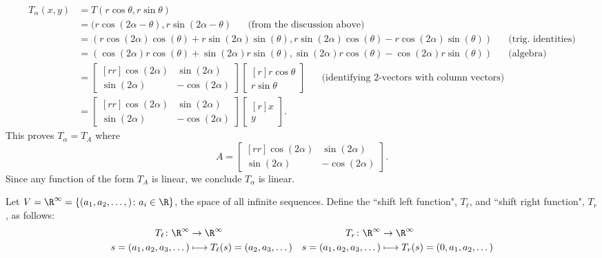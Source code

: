 \begin{solution}
\begin{align*}
T_{\alpha}(x,y)&=T(r\cos\theta,r\sin\theta)\\
&=(r\cos(2\alpha-\theta),r\sin(2\alpha-\theta) \hspace{20pt} \text{(from the discussion above)}\\
&=(r\cos(2\alpha)\cos(\theta)+r\sin(2\alpha)\sin(\theta),r\sin(2\alpha)\cos(\theta)-r\cos(2\alpha)\sin(\theta))  \hspace{20pt}\text{(trig. identities)}\\
&=(\cos(2\alpha)r\cos(\theta)+\sin(2\alpha)r\sin(\theta),\sin(2\alpha)r\cos(\theta)-\cos(2\alpha)r\sin(\theta))  \hspace{20pt}\text{(algebra)}\\
&=\begin{bmatrix}[rr]
\cos(2\alpha)&\sin(2\alpha)\\
\sin(2\alpha)&-\cos(2\alpha)
\end{bmatrix}
\begin{bmatrix}[r]
r\cos\theta\\
r\sin\theta
\end{bmatrix}  \hspace{20pt}\text{(identifying 2-vectors with column vectors)}\\
&=\begin{bmatrix}[rr]
\cos(2\alpha)&\sin(2\alpha)\\
\sin(2\alpha)&-\cos(2\alpha)
\end{bmatrix}
\begin{bmatrix}[r]
x\\
y
\end{bmatrix}.
\end{align*}
This proves $T_\alpha=T_A$ where 
\[
A=\begin{bmatrix}[rr]
\cos(2\alpha)&\sin(2\alpha)\\
\sin(2\alpha)&-\cos(2\alpha)
\end{bmatrix}.
\]
Since any function of the form $T_A$ is linear, we conclude $T_\alpha$ is linear. 

\end{solution}
\ii Let $V=\R^\infty=\{(a_1,a_2,\dots, )\colon a_i\in\R\}$, the space of all infinite sequences. Define the ``shift left function", $T_\ell$, and ``shift right function", $T_r$, as follows:
\begin{align*}
T_\ell\colon \R^\infty&\rightarrow \R^\infty & T_r\colon \R^\infty&\rightarrow \R^\infty\\
s=(a_1,a_2, a_3,\dots )&\longmapsto T_\ell(s)=(a_2, a_3,\dots) & s=(a_1,a_2, a_3,\dots )&\longmapsto T_r(s)=(0,a_1,a_2,\dots) 
\end{align*}
